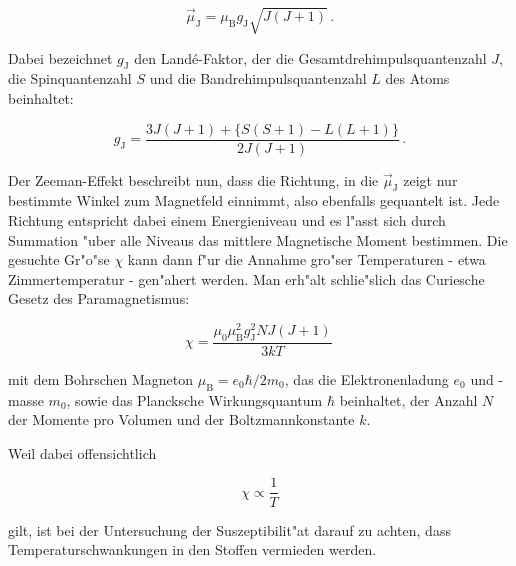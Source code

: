 		\begin{equation*}
			\vec{\mu}_\mathrm{J} = \mu_\mathrm{B} g_\mathrm{J} \sqrt{J(J + 1)}\,.
		\end{equation*}

		Dabei bezeichnet $g_\mathrm{J}$ den Land\'e-Faktor, der die Gesamtdrehimpulsquantenzahl $J$, die Spinquantenzahl $S$ und die Bandrehimpulsquantenzahl $L$ des Atoms beinhaltet:

		\begin{equation*}
			g_\mathrm{J} = \frac{3 J(J + 1) + \{S (S + 1) - L(L + 1)\}}{2J(J + 1)}\,.
		\end{equation*}

		Der Zeeman-Effekt beschreibt nun, dass die Richtung, in die $\vec{\mu}_\mathrm{J}$ zeigt nur bestimmte Winkel zum Magnetfeld einnimmt, also ebenfalls gequantelt ist.
		Jede Richtung entspricht dabei einem Energieniveau und es l"asst sich durch Summation "uber alle Niveaus das mittlere Magnetische Moment bestimmen.
		Die gesuchte Gr"o"se $\chi$ kann dann f"ur die Annahme gro"ser Temperaturen - etwa Zimmertemperatur -  gen"ahert werden.
		\clearpage
		Man erh"alt schlie"slich das Curiesche Gesetz des Paramagnetismus:

		\begin{equation}
			\label{curie}
			\chi = \frac{\mu_0 \mu_\mathrm{B}^2 g_\mathrm{J}^2 N J(J+1)}{3kT}\,
		\end{equation}

		mit dem Bohrschen Magneton $\mu_\mathrm{B} = e_0 \hbar / 2 m_0$, das die Elektronenladung $e_0$ und -masse $m_0$, sowie das Plancksche Wirkungsquantum $\hbar$ beinhaltet, der Anzahl $N$ der Momente pro Volumen und der Boltzmannkonstante $k$.

		Weil dabei offensichtlich

		\begin{equation*}
			\chi \propto \frac{1}{T}
		\end{equation*}

		gilt, ist bei der Untersuchung der Suszeptibilit"at darauf zu achten, dass Temperaturschwankungen in den Stoffen vermieden werden.


